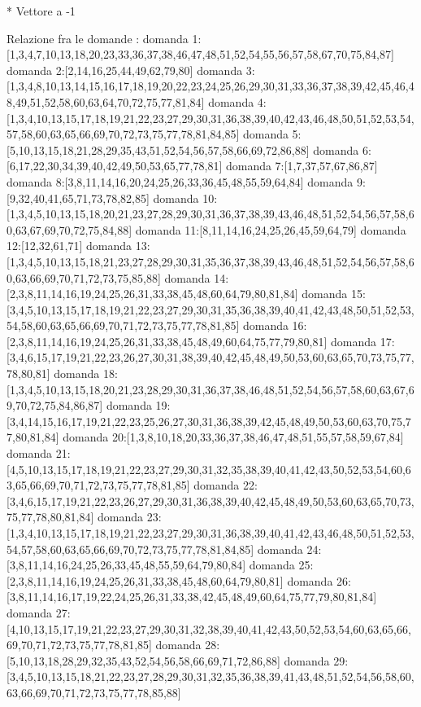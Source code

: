 * Vettore a -1

Relazione fra le domande :
domanda 1:[1,3,4,7,10,13,18,20,23,33,36,37,38,46,47,48,51,52,54,55,56,57,58,67,70,75,84,87]
domanda 2:[2,14,16,25,44,49,62,79,80]
domanda 3:[1,3,4,8,10,13,14,15,16,17,18,19,20,22,23,24,25,26,29,30,31,33,36,37,38,39,42,45,46,48,49,51,52,58,60,63,64,70,72,75,77,81,84]
domanda 4:[1,3,4,10,13,15,17,18,19,21,22,23,27,29,30,31,36,38,39,40,42,43,46,48,50,51,52,53,54,57,58,60,63,65,66,69,70,72,73,75,77,78,81,84,85]
domanda 5:[5,10,13,15,18,21,28,29,35,43,51,52,54,56,57,58,66,69,72,86,88]
domanda 6:[6,17,22,30,34,39,40,42,49,50,53,65,77,78,81]
domanda 7:[1,7,37,57,67,86,87]
domanda 8:[3,8,11,14,16,20,24,25,26,33,36,45,48,55,59,64,84]
domanda 9:[9,32,40,41,65,71,73,78,82,85]
domanda 10:[1,3,4,5,10,13,15,18,20,21,23,27,28,29,30,31,36,37,38,39,43,46,48,51,52,54,56,57,58,60,63,67,69,70,72,75,84,88]
domanda 11:[8,11,14,16,24,25,26,45,59,64,79]
domanda 12:[12,32,61,71]
domanda 13:[1,3,4,5,10,13,15,18,21,23,27,28,29,30,31,35,36,37,38,39,43,46,48,51,52,54,56,57,58,60,63,66,69,70,71,72,73,75,85,88]
domanda 14:[2,3,8,11,14,16,19,24,25,26,31,33,38,45,48,60,64,79,80,81,84]
domanda 15:[3,4,5,10,13,15,17,18,19,21,22,23,27,29,30,31,35,36,38,39,40,41,42,43,48,50,51,52,53,54,58,60,63,65,66,69,70,71,72,73,75,77,78,81,85]
domanda 16:[2,3,8,11,14,16,19,24,25,26,31,33,38,45,48,49,60,64,75,77,79,80,81]
domanda 17:[3,4,6,15,17,19,21,22,23,26,27,30,31,38,39,40,42,45,48,49,50,53,60,63,65,70,73,75,77,78,80,81]
domanda 18:[1,3,4,5,10,13,15,18,20,21,23,28,29,30,31,36,37,38,46,48,51,52,54,56,57,58,60,63,67,69,70,72,75,84,86,87]
domanda 19:[3,4,14,15,16,17,19,21,22,23,25,26,27,30,31,36,38,39,42,45,48,49,50,53,60,63,70,75,77,80,81,84]
domanda 20:[1,3,8,10,18,20,33,36,37,38,46,47,48,51,55,57,58,59,67,84]
domanda 21:[4,5,10,13,15,17,18,19,21,22,23,27,29,30,31,32,35,38,39,40,41,42,43,50,52,53,54,60,63,65,66,69,70,71,72,73,75,77,78,81,85]
domanda 22:[3,4,6,15,17,19,21,22,23,26,27,29,30,31,36,38,39,40,42,45,48,49,50,53,60,63,65,70,73,75,77,78,80,81,84]
domanda 23:[1,3,4,10,13,15,17,18,19,21,22,23,27,29,30,31,36,38,39,40,41,42,43,46,48,50,51,52,53,54,57,58,60,63,65,66,69,70,72,73,75,77,78,81,84,85]
domanda 24:[3,8,11,14,16,24,25,26,33,45,48,55,59,64,79,80,84]
domanda 25:[2,3,8,11,14,16,19,24,25,26,31,33,38,45,48,60,64,79,80,81]
domanda 26:[3,8,11,14,16,17,19,22,24,25,26,31,33,38,42,45,48,49,60,64,75,77,79,80,81,84]
domanda 27:[4,10,13,15,17,19,21,22,23,27,29,30,31,32,38,39,40,41,42,43,50,52,53,54,60,63,65,66,69,70,71,72,73,75,77,78,81,85]
domanda 28:[5,10,13,18,28,29,32,35,43,52,54,56,58,66,69,71,72,86,88]
domanda 29:[3,4,5,10,13,15,18,21,22,23,27,28,29,30,31,32,35,36,38,39,41,43,48,51,52,54,56,58,60,63,66,69,70,71,72,73,75,77,78,85,88]
